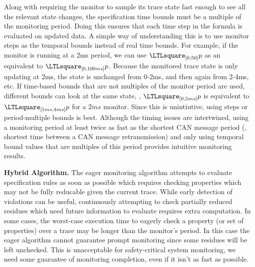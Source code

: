 Along with requiring the monitor to sample its trace state fast enough to see all the relevant state changes, the specification time bounds must be a multiple of the monitoring period.
Doing this ensures that each time step in the formula is evaluated on updated data.
A simple way of understanding this is to use monitor steps as the temporal bounds instead of real time bounds.
For example, if the monitor is running at a 2ms period, we can use $\henceforth_{[0,50]} p$ as an equivalent to $\henceforth_{[0,100ms]} p$.
Because the monitored trace state is only updating at 2ms, the state is unchanged from 0-2ms, and then again from 2-4ms, etc.
If time-based bounds that are not multiples of the monitor period are used, different bounds can look at the same state, \eg, $\henceforth_{[0,5ms]} p$ is equivalent to $\henceforth_{[1ms,4ms]} p$ for a $2ms$ monitor. Since this is unintiutive, using steps or period-multiple bounds is best.
% 
Although the timing issues are intertwined, using a monitoring period at least twice as fast as the shortest CAN message period (\ie, shortest time between a CAN message retransmission) and only using temporal bound values that are multiples of this period provides intuitive monitoring results.


\noindent\textbf{Hybrid Algorithm.}
The eager monitoring algorithm attempts to evaluate specification rules as soon as possible which requires checking properties which may not be fully reducable given the current trace.
While early detection of violations can be useful, continuously attempting to check partially reduced residues which need future information to evaluate requires extra computation.
In some cases, the worst-case execution time to eagerly check a property (or set of properties) over a trace may be longer than the monitor's period. 
In this case the eager algorithm cannot guarantee prompt monitoring since some residues will be left unchecked. This is unacceptable for safety-critical system monitoring, we need some guarantee of monitoring completion, even if it isn't as fast as possible.

